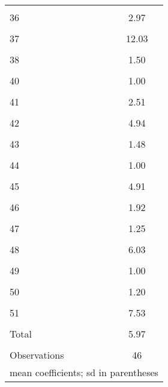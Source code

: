 \begin{table}[htbp]
\begin{tabular}{l*{1}{c}}
                    &            \\
[1em]
36                  &        2.97\\
                    &            \\
[1em]
37                  &       12.03\\
                    &            \\
[1em]
38                  &        1.50\\
                    &            \\
[1em]
40                  &        1.00\\
                    &            \\
[1em]
41                  &        2.51\\
                    &            \\
[1em]
42                  &        4.94\\
                    &            \\
[1em]
43                  &        1.48\\
                    &            \\
[1em]
44                  &        1.00\\
                    &            \\
[1em]
45                  &        4.91\\
                    &            \\
[1em]
46                  &        1.92\\
                    &            \\
[1em]
47                  &        1.25\\
                    &            \\
[1em]
48                  &        6.03\\
                    &            \\
[1em]
49                  &        1.00\\
                    &            \\
[1em]
50                  &        1.20\\
                    &            \\
[1em]
51                  &        7.53\\
                    &            \\
[1em]
Total               &        5.97\\
                    &            \\
\hline
Observations        &          46\\
\hline\hline
\multicolumn{2}{l}{\footnotesize mean coefficients; sd in parentheses}\\
\end{tabular}
\end{table}
